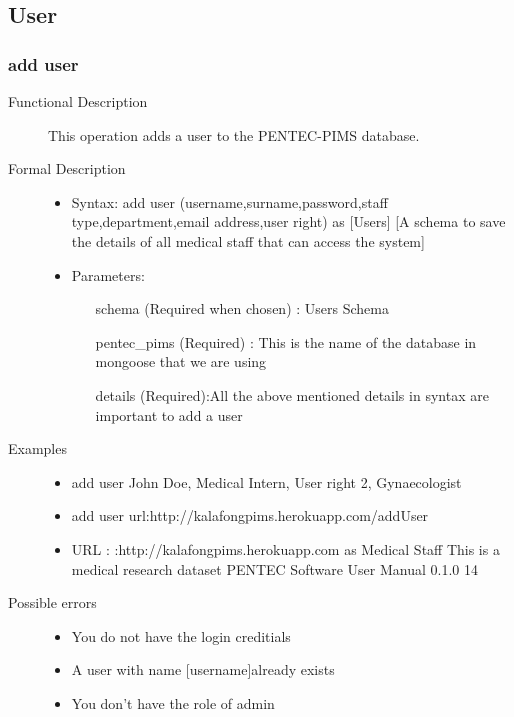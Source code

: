 \documentclass[a4paper]{article}
\begin{document}
\subsection{User}
	  
\subsubsection{add user}
\begin{description}
\item [Functional Description] This operation adds a user to the PENTEC-PIMS database.
\item [Formal Description] \hfill
\begin{itemize}
	\item Syntax: add user (username,surname,password,staff type,department,email address,user right) as [Users] [A schema to save the details of all medical staff that can access the system]\\
	\item Parameters:
		\begin{itemize}
			\item [schema] (Required when chosen) : Users Schema\\
			\item [pentec\_pims] (Required) : This is the name of the database in mongoose that we are using\\
			\item [details](Required):All the above mentioned details in syntax are important to add a user\\
		 \end{itemize}
\end{itemize}
\item[Examples]\hfill
\begin{itemize}
	\item add user John Doe, Medical Intern, User right 2, Gynaecologist
	\item add user url:http://kalafongpims.herokuapp.com/addUser
	\item URL : :http://kalafongpims.herokuapp.com as Medical Staff This is a medical research dataset PENTEC Software User Manual 0.1.0 14
\end{itemize}
\item[Possible errors]\hfill
	\begin{itemize}
	\item You do not have the login creditials
	\item A user with name [username]already exists
	\item You don't have the role of admin

\end{itemize}
\end{description}
\end{document}
